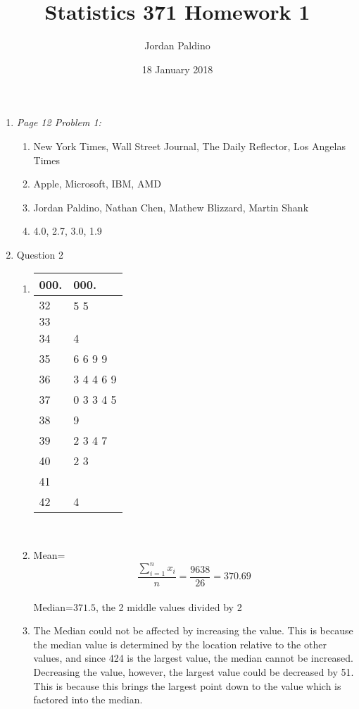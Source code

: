 \documentclass{article}
\title{Statistics 371 Homework 1}
\author{Jordan Paldino}
\date{18 January 2018}
\begin{document}
\maketitle
\begin{enumerate}
\item \textit{Page 12 Problem 1:} \\
\begin{enumerate}
\item New York Times, Wall Street Journal, The Daily Reflector, Los Angelas Times \\
\item Apple, Microsoft, IBM, AMD \\
\item Jordan Paldino, Nathan Chen, Mathew Blizzard, Martin Shank \\
\item 4.0, 2.7, 3.0, 1.9 \\
\end{enumerate}
\item Question 2\\
\begin{enumerate}
\item \begin{tabular}{l|l }
\textbf{00}0. & 00\textbf{0}. \\ \hline
$32$ & 5 5\\
$33$ & \\
34 & 4 \\
35 & 6 6 9 9 \\
36 & 3 4 4 6 9 \\
37 & 0 3 3 4 5 \\
38 & 9 \\
39 & 2 3 4 7 \\
40 & 2 3 \\
41 &  \\
42 & 4\\
\end{tabular} \\
\item Mean=$$\frac{\sum\limits_{i=1}^{n} x_i}{n}= \frac{9638}{26}=370.69$$ \\
Median=$371.5$, the 2 middle values divided by 2 \\
\item The Median could not be affected by increasing the value. This is because the median value is determined by the location relative to the other values, and since 424 is the largest value, the median cannot be increased.\\
Decreasing the value, however, the largest value could be decreased by 51. This is because this brings the largest point down to the value which is factored into the median.

\end{enumerate}
\end{enumerate}
\end{document}
